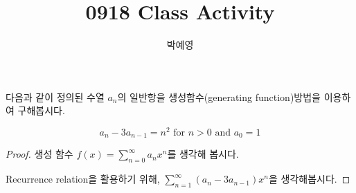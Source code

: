 \documentclass[a4paper, 12pt]{article}
\title{0918 Class Activity}
\author{박예영}
\begin{document}
\maketitle
\begin{mdframed}
다음과 같이 정의된 수열 {$a_n$}의 일반항을 생성함수(generating function)방법을 이용하여 구해봅시다.

$$
a_n - 3 a_{n-1} = n^2 \textrm{ for }n>0 \textrm{ and } a_0 = 1
$$
\end{mdframed}
\doublespacing

\begin{proof}

생성 함수 $\displaystyle f(x) = \sum_{n=0}^{\infty} a_n x^n$를 생각해 봅시다.

Recurrence relation을 활용하기 위해, $\displaystyle \sum_{n=1}^{\infty} (a_n - 3a_{n-1} ) x^n$을 생각해봅시다.




\end{proof}
\end{document}
